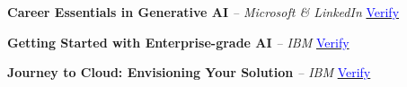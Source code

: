 


\begin{cvskills}

  \cvskill
    {{\bf Career Essentials in Generative AI} \textit{-- Microsoft \& LinkedIn}}
    {\hspace{8cm}\href{https://www.linkedin.com/learning/certificates/d54123165aa8b3229dda8ce7be2699f76fedad2738875f9da76c262a0c50900c?lipi=urn\%3Ali\%3Apage\%3Ad_flagship3_profile_view_base_certifications_details\%3BRIJDRhP\%2BRam7ci30nIbyOQ\%3D\%3D}{\textcolor{blue}{Verify}}}

  \cvskill
    {{\bf Getting Started with Enterprise-grade AI} \textit{-- IBM}}
    {\hspace{8cm}\href{https://www.credly.com/badges/f8a3192d-1667-4d5f-810e-7d7af43cf513}{\textcolor{blue}{Verify}}}

  \cvskill
    {{\bf Journey to Cloud: Envisioning Your Solution} \textit{-- IBM}}
    {\hspace{8cm}\href{https://www.credly.com/badges/cf95b8bc-3194-43fb-a8a5-19ce96a2f5ec}{\textcolor{blue}{Verify}}}

\end{cvskills}
